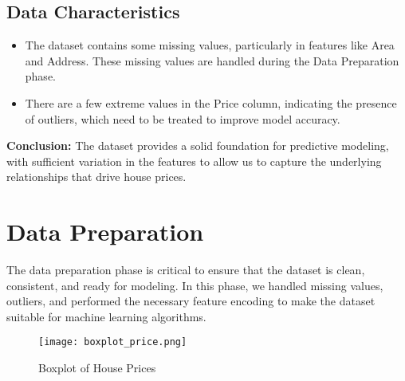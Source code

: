 \documentclass{article}
\begin{document}
\subsection{Data Characteristics}
\begin{itemize}
    \item The dataset contains some missing values, particularly in features like Area and Address. These missing values are handled during the Data Preparation phase.
    \item There are a few extreme values in the Price column, indicating the presence of outliers, which need to be treated to improve model accuracy.
\end{itemize}

\textbf{Conclusion:} The dataset provides a solid foundation for predictive modeling, with sufficient variation in the features to allow us to capture the underlying relationships that drive house prices.

\section{Data Preparation}
The data preparation phase is critical to ensure that the dataset is clean, consistent, and ready for modeling. In this phase, we handled missing values, outliers, and performed the necessary feature encoding to make the dataset suitable for machine learning algorithms.

\begin{figure}[h]
    \centering
    \texttt{[image: boxplot\_price.png]}
    \caption{Boxplot of House Prices}
    \label{fig:boxplot_price}
\end{figure}
\end{document}
